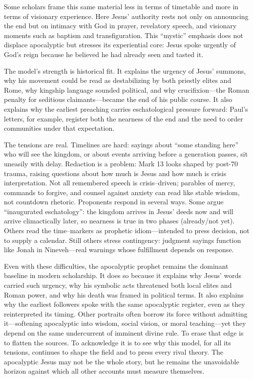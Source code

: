 Some scholars frame this same material less in terms of timetable and more in terms of visionary experience.
Here Jesus’ authority rests not only on announcing the end but on intimacy with God in prayer, revelatory speech, and visionary moments such as baptism and transfiguration.
This “mystic” emphasis does not displace apocalyptic but stresses its experiential core: Jesus spoke urgently of God’s reign because he believed he had already seen and tasted it.

The model’s strength is historical fit.
It explains the urgency of Jesus’ summons, why his movement could be read as destabilizing by both priestly elites and Rome, why kingship language sounded political, and why crucifixion—the Roman penalty for seditious claimants—became the end of his public course.
It also explains why the earliest preaching carries eschatological pressure forward: Paul’s letters, for example, register both the nearness of the end and the need to order communities under that expectation.

The tensions are real.
Timelines are hard: sayings about “some standing here” who will see the kingdom, or about events arriving before a generation passes, sit uneasily with delay.
Redaction is a problem: Mark 13 looks shaped by post-70 trauma, raising questions about how much is Jesus and how much is crisis interpretation.
Not all remembered speech is crisis–driven; parables of mercy, commands to forgive, and counsel against anxiety can read like stable wisdom, not countdown rhetoric.
Proponents respond in several ways.
Some argue “inaugurated eschatology”: the kingdom arrives in Jesus’ deeds now and will arrive climactically later, so nearness is true in two phases (already/not yet).
Others read the time–markers as prophetic idiom—intended to press decision, not to supply a calendar.
Still others stress contingency: judgment sayings function like Jonah in Nineveh—real warnings whose fulfillment depends on response.

Even with these difficulties, the apocalyptic prophet remains the dominant baseline in modern scholarship.
It does so because it explains why Jesus’ words carried such urgency, why his symbolic acts threatened both local elites and Roman power, and why his death was framed in political terms.
It also explains why the earliest followers spoke with the same apocalyptic register, even as they reinterpreted its timing.
Other portraits often borrow its force without admitting it—softening apocalyptic into wisdom, social vision, or moral teaching—yet they depend on the same undercurrent of imminent divine rule.
To erase that edge is to flatten the sources.
To acknowledge it is to see why this model, for all its tensions, continues to shape the field and to press every rival theory.
The apocalyptic Jesus may not be the whole story, but he remains the unavoidable horizon against which all other accounts must measure themselves.


